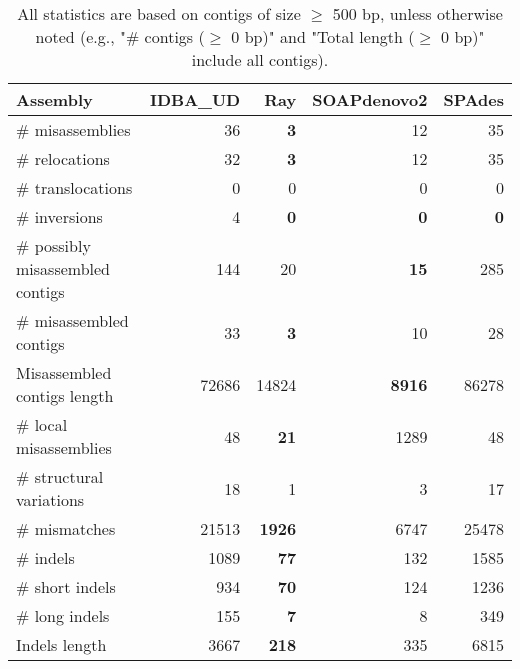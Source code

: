 \documentclass[12pt,a4paper]{article}
\begin{document}
\begin{table}[ht]
\begin{center}
\caption{All statistics are based on contigs of size $\geq$ 500 bp, unless otherwise noted (e.g., "\# contigs ($\geq$ 0 bp)" and "Total length ($\geq$ 0 bp)" include all contigs).}
\begin{tabular}{|l*{4}{|r}|}
\hline
Assembly & IDBA\_UD & Ray & SOAPdenovo2 & SPAdes \\ \hline
\# misassemblies & 36 & {\bf 3} & 12 & 35 \\ \hline
\hspace{5mm}\# relocations & 32 & {\bf 3} & 12 & 35 \\ \hline
\hspace{5mm}\# translocations & 0 & 0 & 0 & 0 \\ \hline
\hspace{5mm}\# inversions & 4 & {\bf 0} & {\bf 0} & {\bf 0} \\ \hline
\# possibly misassembled contigs & 144 & 20 & {\bf 15} & 285 \\ \hline
\# misassembled contigs & 33 & {\bf 3} & 10 & 28 \\ \hline
Misassembled contigs length & 72686 & 14824 & {\bf 8916} & 86278 \\ \hline
\# local misassemblies & 48 & {\bf 21} & 1289 & 48 \\ \hline
\# structural variations & 18 & 1 & 3 & 17 \\ \hline
\# mismatches & 21513 & {\bf 1926} & 6747 & 25478 \\ \hline
\# indels & 1089 & {\bf 77} & 132 & 1585 \\ \hline
\hspace{5mm}\# short indels & 934 & {\bf 70} & 124 & 1236 \\ \hline
\hspace{5mm}\# long indels & 155 & {\bf 7} & 8 & 349 \\ \hline
Indels length & 3667 & {\bf 218} & 335 & 6815 \\ \hline
\end{tabular}
\end{center}
\end{table}
\end{document}
